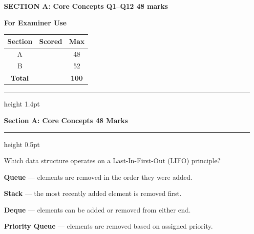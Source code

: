 \documentclass[11pt,a4paper]{article}
\begin{document}
\vspace{8pt}

\noindent\begin{minipage}[t]{0.49\textwidth}
  \begin{scorebox}[NavyBlue]
    {\color{NavyBlue}\footnotesize\bfseries SECTION A: Core Concepts \hfill Q1--Q12 \hfill 48 marks}
  \end{scorebox}
\end{minipage}
\hfill
\begin{minipage}[t]{0.49\textwidth}
  \begin{scorebox}[SuccessGreen]
    {\color{SuccessGreen}\footnotesize\textbf{For Examiner Use}}
    \vspace{2pt}
    \renewcommand{\arraystretch}{1.2}
    \small
    \begin{tabular}{@{}c c c@{}}
      \textbf{Section} & \textbf{Scored} & \textbf{Max} \\
      \hline
      A        & \hspace{1.1cm} & 48  \\
      B        & \hspace{1.1cm} & 52  \\
      \hline
      \textbf{Total} & \hspace{1.1cm} & \textbf{100}
    \end{tabular}
  \end{scorebox}
\end{minipage}

\vspace{12pt}

{\color{NavyBlue}\hrule height 1.4pt}
\vspace{6pt}
{\Large\bfseries\color{NavyBlue} Section A: Core Concepts \hfill {\normalfont\small 48 Marks}}
\vspace{6pt}
{\color{NavyBlue}\hrule height 0.5pt}
\vspace{12pt}

\begin{questionblock}
 Which data structure operates on a Last-In-First-Out (LIFO) principle?
\begin{mcoptions}
  \item[\textbf{A.}] \textbf{Queue} --- elements are removed in the order they were added.
  \item[\textbf{B.}] \textbf{Stack} --- the most recently added element is removed first.
  \item[\textbf{C.}] \textbf{Deque} --- elements can be added or removed from either end.
  \item[\textbf{D.}] \textbf{Priority Queue} --- elements are removed based on assigned priority.
\end{mcoptions}
\end{questionblock}
\end{document}
